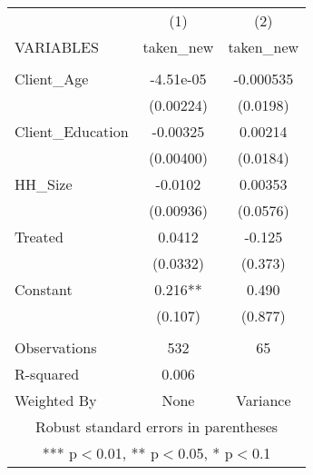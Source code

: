 \begin{tabular}{lcc} \hline
 & (1) & (2) \\
VARIABLES & taken\_new & taken\_new \\ \hline
 &  &  \\
Client\_Age & -4.51e-05 & -0.000535 \\
 & (0.00224) & (0.0198) \\
Client\_Education & -0.00325 & 0.00214 \\
 & (0.00400) & (0.0184) \\
HH\_Size & -0.0102 & 0.00353 \\
 & (0.00936) & (0.0576) \\
Treated & 0.0412 & -0.125 \\
 & (0.0332) & (0.373) \\
Constant & 0.216** & 0.490 \\
 & (0.107) & (0.877) \\
 &  &  \\
Observations & 532 & 65 \\
R-squared & 0.006 &  \\
 Weighted By & None & Variance \\ \hline
\multicolumn{3}{c}{ Robust standard errors in parentheses} \\
\multicolumn{3}{c}{ *** p$<$0.01, ** p$<$0.05, * p$<$0.1} \\
\end{tabular}
